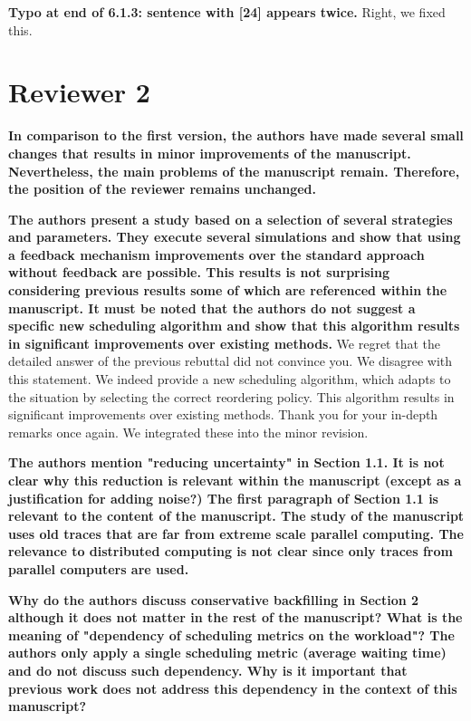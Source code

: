 \documentclass[]{article}
\begin{document}
\textbf{Typo at end of 6.1.3: sentence with [24] appears twice.
}
Right, we fixed this.


\section{Reviewer 2}

\textbf{In comparison to the first version, the authors have made several small changes that results in minor improvements of
the manuscript. Nevertheless, the main problems of the manuscript remain. Therefore, the position of the reviewer
remains unchanged.
}

\textbf{The authors present a study based on a selection of several strategies and parameters. They execute several simulations
and show that using a feedback mechanism improvements over the standard approach without feedback are possible. This
results is not surprising considering previous results some of which are referenced within the manuscript. It must be
noted that the authors do not suggest a specific new scheduling algorithm and show that this algorithm results in
significant improvements over existing methods.
}
We regret that the detailed answer of the previous rebuttal did not convince you. We disagree with this statement. We indeed
provide a new scheduling algorithm, which adapts to the situation by selecting the correct reordering policy. This algorithm
results in significant improvements over existing methods.
Thank you for your in-depth remarks once again. We integrated these into the minor revision.

\textbf{The authors mention "reducing uncertainty" in Section 1.1. It is not clear why this reduction is relevant within the
manuscript (except as a justification for adding noise?)
The first paragraph of Section 1.1 is relevant to the content of the manuscript. The study of the manuscript uses old
traces that are far from extreme scale parallel computing. The relevance to distributed computing is not clear since
only traces from parallel computers are used.
}

\textbf{Why do the authors discuss conservative backfilling in Section 2 although it does not matter in the rest of the
manuscript?
What is the meaning of "dependency of scheduling metrics on the workload"? The authors only apply a single scheduling
metric (average waiting time) and do not discuss such dependency. Why is it important that previous work does not
address this dependency in the context of this manuscript?
}
\end{document}
